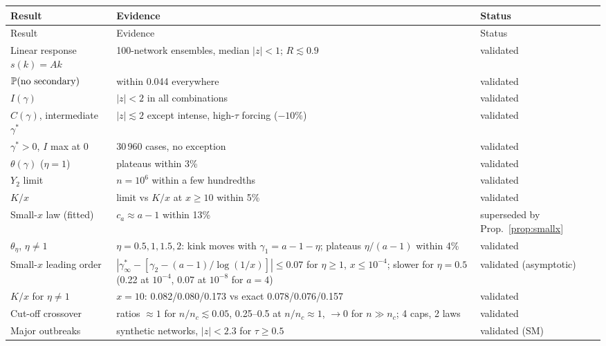\begin{longtable}{p{4.2cm}p{7.2cm}p{3.6cm}}
\toprule Result & Evidence & Status \\ \midrule \endfirsthead
\toprule Result & Evidence & Status \\ \midrule \endhead
Linear response $s(k)=Ak$ & 100-network ensembles, median $|z|<1$; $R\lesssim0.9$ & validated \\
$\mathbb{P}(\text{no secondary})$ & within 0.044 everywhere & validated \\
$I(\gamma)$ & $|z|<2$ in all combinations & validated \\
$C(\gamma)$, intermediate $\gamma^*$ & $|z|\lesssim2$ except intense, high-$\tau$ forcing ($-10\%$) & validated \\
$\gamma^*>0$, $I$ max at 0 & 30\,960 cases, no exception & validated \\
$\theta(\gamma)$ ($\eta=1$) & plateaus within 3\% & validated \\
$Y_2$ limit & $n=10^6$ within a few hundredths & validated \\
$K/x$ & limit vs $K/x$ at $x\ge10$ within 5\% & validated \\
Small-$x$ law (fitted) & $c_a\approx a-1$ within 13\% & superseded by Prop.~\ref{prop:smallx} \\
$\theta_\eta$, $\eta\ne1$ & $\eta=0.5,1,1.5,2$: kink moves with $\gamma_1=a-1-\eta$; plateaus $\eta/(a-1)$ within 4\% & validated \\
Small-$x$ leading order & $|\gamma^*_\infty-[\gamma_2-(a-1)/\log(1/x)]|\le0.07$ for $\eta\ge1$, $x\le10^{-4}$; slower for $\eta=0.5$ (0.22 at $10^{-4}$, 0.07 at $10^{-8}$ for $a=4$) & validated (asymptotic) \\
$K/x$ for $\eta\ne1$ & $x=10$: 0.082/0.080/0.173 vs exact 0.078/0.076/0.157 & validated \\
Cut-off crossover & ratios $\approx1$ for $n/n_c\lesssim0.05$, 0.25--0.5 at $n/n_c\approx1$, $\to0$ for $n\gg n_c$; 4 caps, 2 laws & validated \\
Major outbreaks & synthetic networks, $|z|<2.3$ for $\tau\ge0.5$ & validated (SM) \\
\bottomrule
\end{longtable}
